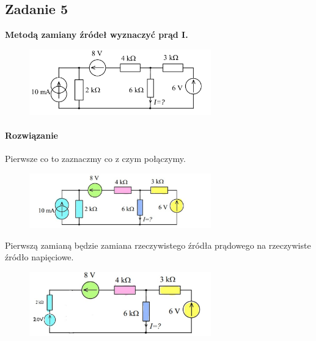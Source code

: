 \documentclass[12pt, a4paper]{article}
\begin{document}
\subsection{Zadanie 5}
\textbf{Metodą zamiany źródeł wyznaczyć prąd I.}
\begin{figure}[H]
  \centering
  \includegraphics[width = 0.7\textwidth]{./images/Lista_1/Zadanie_5.png}
\end{figure}
\paragraph{Rozwiązanie}
\begin{flushleft}
  Pierwsze co to zaznaczmy co z czym połączymy.
\end{flushleft}
\begin{figure}[H]
  \centering
  \includegraphics[width = 0.7\textwidth]{./images/Lista_1/Zadanie5_1.png}
\end{figure}

Pierwszą zamianą będzie zamiana rzeczywistego źródła prądowego na rzeczywiste
źródło napięciowe.
\begin{figure}[H]
  \centering
  \includegraphics[width = 0.7\textwidth]{./images/Lista_1/Zadanie5_2.png}
\end{figure}
\end{document}

